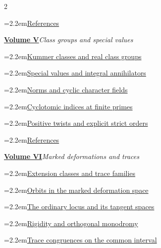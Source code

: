 \documentclass[a4paper,11pt]{article}
\theoremstyle{definition}
\theoremstyle{remark}
\numberwithin{equation}{section}
\begin{document}
\begin{multicols}{2}
\begin{minipage}{\linewidth}
\noindent\hangindent=2.2em\hyperref[nav:bibliography-IV]{References}\par
\end{minipage}\par\medskip
\noindent\begin{minipage}{\linewidth}\raggedright
\textbf{\hyperref[nav:volume-V]{Volume V}}\enspace\emph{Class groups and special values}\par\smallskip
\noindent\hangindent=2.2em\hyperref[nav:g-III-0]{Kummer classes and real class groups}\par
\noindent\hangindent=2.2em\hyperref[nav:g-III-1]{Special values and integral annihilators}\par
\noindent\hangindent=2.2em\hyperref[nav:g-III-2]{Norms and cyclic character fields}\par
\noindent\hangindent=2.2em\hyperref[nav:g-III-3]{Cyclotomic indices at finite primes}\par
\noindent\hangindent=2.2em\hyperref[nav:g-III-4]{Positive twists and explicit strict orders}\par
\noindent\hangindent=2.2em\hyperref[nav:bibliography-V]{References}\par
\end{minipage}\par\medskip
\noindent\begin{minipage}{\linewidth}\raggedright
\textbf{\hyperref[nav:volume-VI]{Volume VI}}\enspace\emph{Marked deformations and traces}\par\smallskip
\noindent\hangindent=2.2em\hyperref[nav:g-IV-0]{Extension classes and trace families}\par
\noindent\hangindent=2.2em\hyperref[nav:g-IV-1]{Orbits in the marked deformation space}\par
\noindent\hangindent=2.2em\hyperref[nav:g-IV-2]{The ordinary locus and its tangent spaces}\par
\noindent\hangindent=2.2em\hyperref[nav:g-IV-3]{Rigidity and orthogonal monodromy}\par
\noindent\hangindent=2.2em\hyperref[nav:g-IV-4]{Trace congruences on the common interval}\par

\end{minipage}
\end{multicols}
\end{document}

